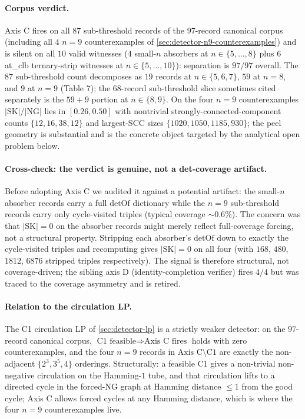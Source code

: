 \documentclass[11pt,a4paper]{article}
\theoremstyle{plain}
\theoremstyle{definition}
\newcommand{\SK}{\mathrm{SK}}
\newcommand{\detOf}{\mathrm{detOf}}
\begin{document}
\paragraph{Corpus verdict.}  Axis C fires on all $87$ sub-threshold
records of the $97$-record canonical corpus (including all $4$
$n = 9$ counterexamples of \cref{sec:detector-n9-counterexamples})
and is silent on all $10$ valid witnesses ($4$ small-$n$ absorbers
at $n \in \{5, \ldots, 8\}$ plus $6$ at\_clb ternary-strip witnesses
at $n \in \{5, \ldots, 10\}$): separation is $97/97$ overall.  The
$87$ sub-threshold count decomposes as $19$ records at
$n \in \{5, 6, 7\}$, $59$ at $n = 8$, and $9$ at $n = 9$ (Table 7);
the $68$-record sub-threshold slice sometimes cited separately is
the $59 + 9$ portion at $n \in \{8, 9\}$.  On the four $n = 9$ counterexamples
$|\SK| / |\mathrm{NG}|$ lies in $[0.26, 0.50]$ with nontrivial
strongly-connected-component counts $\{12, 16, 38, 12\}$ and
largest-SCC sizes $\{1020, 1050, 1185, 930\}$; the peel geometry is
substantial and is the concrete object targeted by the analytical
open problem below.

\paragraph{Cross-check: the verdict is genuine, not a det-coverage
artifact.}  Before adopting Axis C we audited it against a
potential artifact: the small-$n$ absorber records carry a full
$\detOf$ dictionary while the $n = 9$ sub-threshold records carry
only cycle-visited triples (typical coverage $\sim 0.6\%$).  The
concern was that $|\SK| = 0$ on the absorber records might merely
reflect full-coverage forcing, not a structural property.  Stripping
each absorber's $\detOf$ down to exactly the cycle-visited triples
and recomputing gives $|\SK| = 0$ on all four (with $168$, $480$,
$1812$, $6876$ stripped triples respectively).  The signal is
therefore structural, not coverage-driven; the sibling axis D
(identity-completion verifier) fires $4/4$ but was traced to the
coverage asymmetry and is retired.

\paragraph{Relation to the circulation LP.}  The C1 circulation LP
of \cref{sec:detector-lp} is a strictly weaker detector: on the
$97$-record canonical corpus, $\text{C1 feasible} \Rightarrow
\text{Axis C fires}$ holds with zero counterexamples, and the four
$n = 9$ records in $\text{Axis C} \setminus \text{C1}$ are exactly
the non-adjacent $\{2^3, 3^5, 4\}$ orderings.  Structurally: a
feasible C1 gives a non-trivial non-negative circulation on the
Hamming-$1$ tube, and that circulation lifts to a directed cycle
in the forced-NG graph at Hamming distance $\le 1$ from the good
cycle; Axis C allows forced cycles at any Hamming distance, which
is where the four $n = 9$ counterexamples live.
\end{document}
